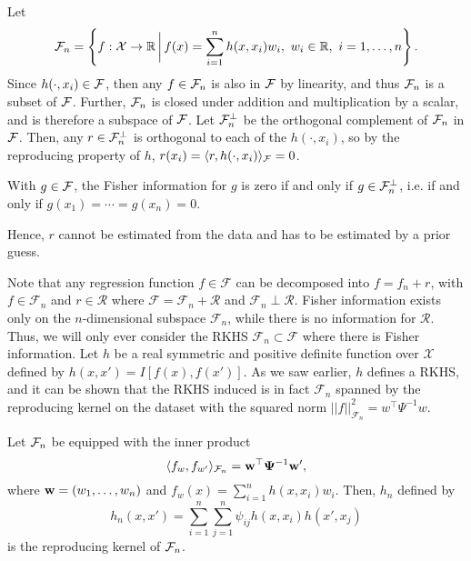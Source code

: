 \documentclass[a4paper,showframe,11pt,draft]{report}
\begin{document}
Let 
\begin{align}
{\mathcal F}_n = \left\{ f:{\mathcal X} \to \mathbb{R} \, \bigg| \, f(x) = \sum_{i=1}^n h(x,x_i)w_i, \ w_i \in \mathbb{R}, \ i=1,\dots,n \right\}.  
\end{align}
Since $h(\cdot,x_i) \in {\mathcal F}$, then any $f \in {\mathcal F}_n$ is also in ${\mathcal F}$ by linearity, and thus ${\mathcal F}_n$ is a subset of ${\mathcal F}$.
Further, ${\mathcal F}_n$ is closed under addition and multiplication by a scalar, and is therefore a subspace of ${\mathcal F}$.
Let ${\mathcal F}_n^\bot$ be the orthogonal complement of ${\mathcal F}_n$ in ${\mathcal F}$.
Then, any $r \in {\mathcal F}_n^\bot$ is orthogonal to each of the $h(\cdot,x_i)$, so by the reproducing property of $h$, $r(x_i) = \langle r,h(\cdot,x_i)\rangle_{\mathcal F} = 0$.

\begin{corollary}
  With $g \in {\mathcal F}$, the Fisher information for $g$ is zero if and only if $g\in{\mathcal F}_n^\bot$, i.e. if and only if $g(x_1) = \cdots = g(x_n) = 0$.
\end{corollary}

Hence, $r$ cannot be estimated from the data and has to be estimated by a prior guess.

Note that any regression function $f\in \mathcal F$ can be decomposed into $f = f_n + r$, with $f \in \mathcal F_n$ and $r \in \mathcal R$ where $\mathcal F = \mathcal F_n + \mathcal R$ and $\mathcal F_n \perp \mathcal R$. Fisher information exists only on the $n$-dimensional subspace $\mathcal F_n$, while there is no information for $\mathcal R$. Thus, we will only ever consider the RKHS $\mathcal F_n \subset \mathcal F$ where there is Fisher information. Let $h$ be a real symmetric and positive definite function over $\mathcal X$ defined by $h(x,x') = I[f(x),f(x')]$. As we saw earlier, $h$ defines a RKHS, and it can be shown that the RKHS induced is in fact $\mathcal F_n$ spanned by the reproducing kernel on the dataset with the squared norm $||f||_{\mathcal F_n}^2 = w^\top\Psi^{-1}w$.

\begin{lemma}
  Let ${\mathcal F}_n$ be equipped with the inner product
  \[
    \langle f_w, f_{w'}\rangle_{{\mathcal F}_n} = {\mathbf w}^\top {\bm\Psi}^{-1} {\mathbf w}',
  \]
  where ${\mathbf w} = (w_1,\dots,w_n)$ and $f_w(x)=\sum_{i=1}^n h(x,x_i)w_i$.
  Then, $h_n$ defined by
  \[
    h_n(x,x') = \sum_{i=1}^n\sum_{j=1}^n \psi_{ij}h(x,x_i)h(x',x_j)
  \]
  is the reproducing kernel of ${\mathcal F}_n$.
\end{lemma}
\end{document}
